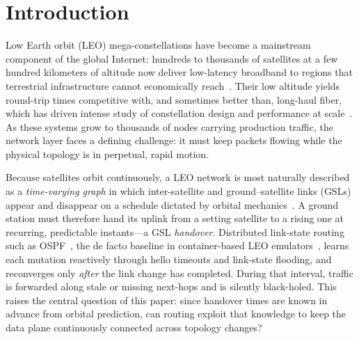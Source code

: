 
\section{Introduction}
\label{sec:intro}

Low Earth orbit (LEO) mega-constellations have become a mainstream component of
the global Internet: hundreds to thousands of satellites at a few hundred
kilometers of altitude now deliver low-latency broadband to regions that
terrestrial infrastructure cannot economically reach~\cite{smallsats2020,
handley:ground-relays:2019}.
Their low altitude yields round-trip times competitive with, and sometimes
better than, long-haul fiber, which has driven intense study of constellation
design and performance at scale~\cite{kassing2020exploring,lai2020starperf}.
As these systems grow to thousands of nodes carrying production traffic, the
network layer faces a defining challenge: it must keep packets flowing while the
physical topology is in perpetual, rapid motion.

Because satellites orbit continuously, a LEO network is most naturally described
as a \emph{time-varying graph} in which inter-satellite and ground--satellite
links (GSLs) appear and disappear on a schedule dictated by orbital
mechanics~\cite{seong:topological-design:1995,kassing2020exploring}.
A ground station must therefore hand its uplink from a setting satellite to a
rising one at recurring, predictable instants---a GSL \emph{handover}.
Distributed link-state routing such as OSPF~\cite{sidhu:ospf:1993}, the de facto
baseline in container-based LEO emulators~\cite{lai2023starrynet}, learns each
mutation reactively through hello timeouts and link-state flooding, and
reconverges only \emph{after} the link change has completed.
During that interval, traffic is forwarded along stale or missing next-hops and
is silently black-holed.
This raises the central question of this paper: since handover times are known
in advance from orbital prediction, can routing exploit that knowledge to keep
the data plane continuously connected across topology changes?

